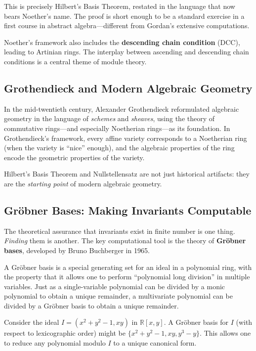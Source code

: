 This is precisely Hilbert's Basis Theorem, restated in the language that now bears Noether's name. The proof is short enough to be a standard exercise in a first course in abstract algebra---different from Gordan's extensive computations.

Noether's framework also includes the \textbf{descending chain condition} (DCC), leading to Artinian rings. The interplay between ascending and descending chain conditions is a central theme of module theory.

\subsection{Grothendieck and Modern Algebraic Geometry}

In the mid-twentieth century, Alexander Grothendieck reformulated algebraic geometry in the language of \emph{schemes} and \emph{sheaves}, using the theory of commutative rings---and especially Noetherian rings---as its foundation. In Grothendieck's framework, every affine variety corresponds to a Noetherian ring (when the variety is ``nice'' enough), and the algebraic properties of the ring encode the geometric properties of the variety.

Hilbert's Basis Theorem and Nullstellensatz are not just historical artifacts: they are the \emph{starting point} of modern algebraic geometry.

\subsection{Gr\"obner Bases: Making Invariants Computable}

The theoretical assurance that invariants exist in finite number is one thing. \emph{Finding} them is another. The key computational tool is the theory of \textbf{Gr\"obner bases}, developed by Bruno Buchberger in 1965.

A Gr\"obner basis is a special generating set for an ideal in a polynomial ring, with the property that it allows one to perform ``polynomial long division'' in multiple variables. Just as a single-variable polynomial can be divided by a monic polynomial to obtain a unique remainder, a multivariate polynomial can be divided by a Gr\"obner basis to obtain a unique remainder.

\begin{example}
Consider the ideal $I = (x^2 + y^2 - 1, xy)$ in $\mathbb{R}[x,y]$. A Gr\"obner basis for $I$ (with respect to lexicographic order) might be $\{x^2 + y^2 - 1, xy, y^3 - y\}$. This allows one to reduce any polynomial modulo $I$ to a unique canonical form.
\end{example}

